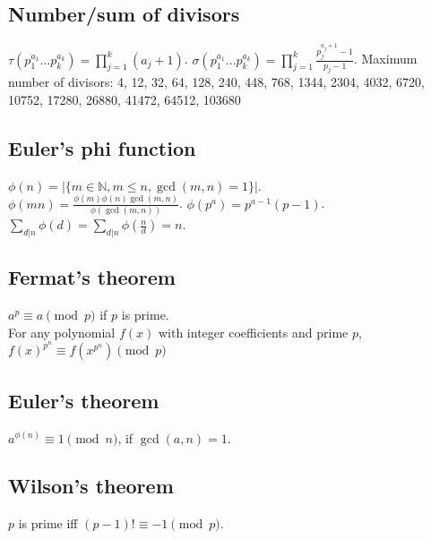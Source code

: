 \documentclass[12pt]{extarticle}
\begin{document}
\begin{multicols*}{2}
\subsection{Number/sum of divisors}
$\tau(p_1^{a_1} \dots p_k^{a_k}) = \prod_{j=1}^k (a_j+1)$. \quad
$\sigma(p_1^{a_1} \dots p_k^{a_k}) = \prod_{j=1}^k \frac{p_j^{a_j+1}-1}{p_j-1}$.
Maximum number of divisors: 4, 12, 32, 64, 128, 240, 448, 768, 1344, 2304, 4032, 6720, 10752, 17280, 26880, 41472, 64512, 103680

\subsection{Euler's phi function}
$\phi(n)=|\{m \in {\mathbb N}, m \le n, \gcd(m, n) = 1 \}|$. \\
$\phi(mn) = \frac{\phi(m) \phi(n) \gcd(m,n)}{\phi(\gcd(m,n))}$. \quad
$\phi(p^a) = p^{a-1} (p-1)$. \quad
$\sum_{d|n} \phi(d) = \sum_{d|n} \phi(\frac{n}{d}) = n$.

\subsection{Fermat's theorem}  $a^p \equiv a \pmod{p}$ if $p$ is prime. \\
For any polynomial $f(x)$ with integer coefficients and prime $p$,
$f(x)^{p^n} \equiv f(x^{p^n}) \pmod{p}$
\subsection{Euler's theorem} $a^{\phi(n)} \equiv 1\pmod{n}$, if $\gcd(a,n)=1$. \\
\subsection{Wilson's theorem} $p$ is prime iff $(p - 1)! \equiv -1 \pmod p$.



\end{multicols*}
\end{document}
